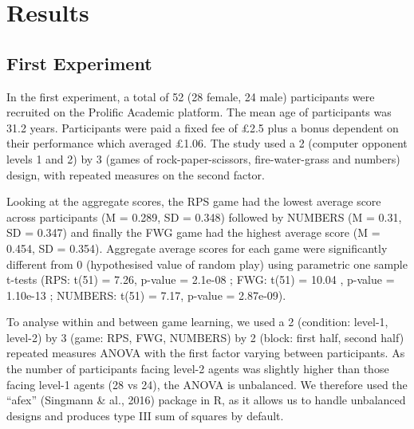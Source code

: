 \documentclass[man,floatsintext]{apa6}
\begin{document}
\hypertarget{results}{%
\section{Results}\label{results}}

\hypertarget{first-experiment-1}{%
\subsection{First Experiment}\label{first-experiment-1}}

In the first experiment, a total of 52 (28 female, 24 male) participants were recruited on the Prolific Academic platform. The mean age of participants was 31.2 years. Participants were paid a fixed fee of £2.5 plus a bonus dependent on their performance which averaged £1.06. The study used a 2 (computer opponent levels 1 and 2) by 3 (games of rock-paper-scissors, fire-water-grass and numbers) design, with repeated measures on the second factor.

Looking at the aggregate scores, the RPS game had the lowest average score across participants (M = 0.289, SD = 0.348) followed by NUMBERS (M = 0.31, SD = 0.347) and finally the FWG game had the highest average score (M = 0.454, SD = 0.354). Aggregate average scores for each game were significantly different from 0 (hypothesised value of random play) using parametric one sample t-tests (RPS: t(51) = 7.26, p-value = 2.1e-08 ; FWG: t(51) = 10.04 , p-value = 1.10e-13 ; NUMBERS: t(51) = 7.17, p-value = 2.87e-09).

To analyse within and between game learning, we used a 2 (condition: level-1, level-2) by 3 (game: RPS, FWG, NUMBERS) by 2 (block: first half, second half) repeated measures ANOVA with the first factor varying between participants. As the number of participants facing level-2 agents was slightly higher than those facing level-1 agents (28 vs 24), the ANOVA is unbalanced. We therefore used the ``afex'' (Singmann \& al., 2016) package in R, as it allows us to handle unbalanced designs and produces type III sum of squares by default.
\end{document}
